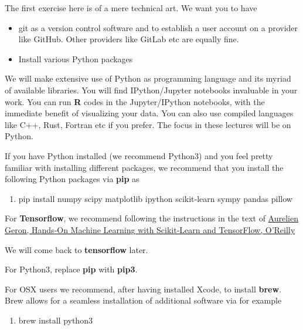 \documentclass[%
oneside,                 %
final,                   %
10pt]{article}
\newenvironment{doconceexercise}{}{}
\newcounter{doconceexercisecounter}
\begin{document}
\begin{doconceexercise}



The first exercise here is of a mere technical art. We want you to have 
\begin{itemize}
\item git as a version control software and to establish a user account on a provider like GitHub. Other providers like GitLab etc are equally fine. 

\item Install various Python packages
\end{itemize}

\noindent
We will make extensive use of Python as programming language and its
myriad of available libraries.  You will find
IPython/Jupyter notebooks invaluable in your work.  You can run \textbf{R}
codes in the Jupyter/IPython notebooks, with the immediate benefit of
visualizing your data. You can also use compiled languages like C++,
Rust, Fortran etc if you prefer. The focus in these lectures will be
on Python.

If you have Python installed (we recommend Python3) and you feel
pretty familiar with installing different packages, we recommend that
you install the following Python packages via \textbf{pip} as 

\begin{enumerate}
\item pip install numpy scipy matplotlib ipython scikit-learn sympy pandas pillow 
\end{enumerate}

\noindent
For \textbf{Tensorflow}, we recommend following the instructions in the text of 
\href{{http://shop.oreilly.com/product/0636920052289.do}}{Aurelien Geron, Hands‑On Machine Learning with Scikit‑Learn and TensorFlow, O'Reilly}

We will come back to \textbf{tensorflow} later. 

For Python3, replace \textbf{pip} with \textbf{pip3}.

For OSX users we recommend, after having installed Xcode, to
install \textbf{brew}. Brew allows for a seamless installation of additional
software via for example 

\begin{enumerate}
\item brew install python3
\end{enumerate}


\end{doconceexercise}
\end{document}
